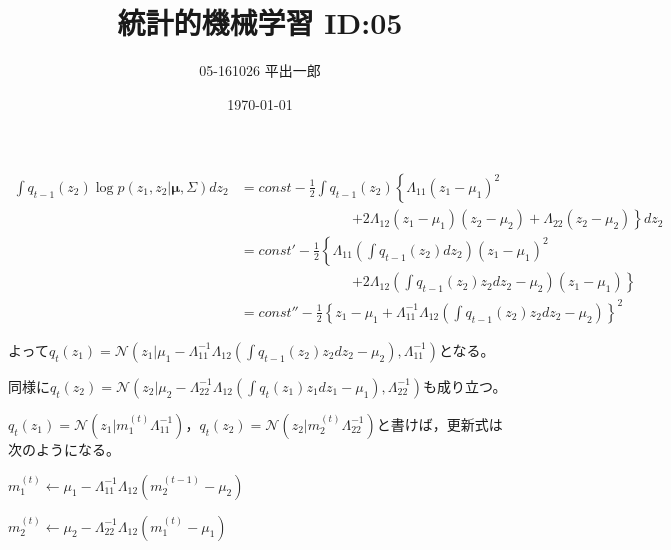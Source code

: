\documentclass[a4j]{jarticle}
\title{統計的機械学習 ID:05}
\author{05-161026 平出一郎}
\date{\today}
\begin{document}
\thispagestyle{empty}
\maketitle
\pagebreak

\begin{align*}
\int q_{t-1}(z_2)\log p( z_1,z_2 | \bm{\mu},\Sigma) dz_2 &= const - \frac{1}{2}\int q_{t-1}(z_2)\left\{ \Lambda_{11}(z_1-\mu_1)^2 \right. \\
&\quad\quad\quad\quad\quad\quad\quad\quad \left. + 2\Lambda_{12}(z_1-\mu_1)(z_2-\mu_2) +\Lambda_{22}(z_2-\mu_2) \right\} dz_2 \\
&=const' - \frac{1}{2} \left\{ \Lambda_{11}\left(\int q_{t-1}(z_2)dz_2\right)(z_1-\mu_1)^2\right.\\
&\quad\quad\quad\quad\quad\quad\quad\quad \left.+2\Lambda_{12}\left(\int q_{t-1}(z_2)z_2dz_2 - \mu_2 \right)(z_1-\mu_1) \right\} \\
&=const'' - \frac{1}{2}\left\{ z_1-\mu_1+\Lambda_{11}^{-1}\Lambda_{12} \left( \int q_{t-1}(z_2)z_2dz_2 - \mu_2  \right) \right\}^2
\end{align*}


よって$q_t(z_1) = \mathcal{N} ( z_1 | \mu_1- \Lambda_{11}^{-1}\Lambda_{12} ( \int q_{t-1}(z_2)z_2dz_2 - \mu_2) ,\Lambda_{11}^{-1} ) $となる。


同様に$q_t(z_2) = \mathcal{N} ( z_2 | \mu_2- \Lambda_{22}^{-1}\Lambda_{12} ( \int q_{t}(z_1)z_1dz_1 - \mu_1 ) ,\Lambda_{22}^{-1}  )$も成り立つ。

$q_t(z_1) = \mathcal{N}(z_1 |  m^{(t)}_1 \Lambda_{11}^{-1} )$，$q_t(z_2) = \mathcal{N}(z_2 |  m^{(t)}_2 \Lambda_{22}^{-1} )$と書けば，更新式は次のようになる。

$m^{(t)}_1 \leftarrow \mu_1-\Lambda_{11}^{-1}\Lambda_{12} ( m_2^{(t-1)} - \mu_2)$


$m^{(t)}_2 \leftarrow \mu_2-\Lambda_{22}^{-1}\Lambda_{12} ( m_1^{(t)} - \mu_1)$
\end{document}
